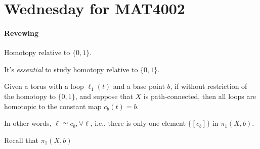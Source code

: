 \section{Wednesday for MAT4002}
\paragraph{Revewing}
Homotopy relative to $\{0,1\}$.

It's \emph{essential} to study homotopy relative to $\{0,1\}$.

Given a torus with a loop $\ell_1(t)$ and a base point $b$,
if without restriction of the homotopy to $\{0,1\}$, and suppose that $X$ is path-connected,
then all loops are homotopic to the constant map $c_b(t)=b$.

In other words, $\ell\simeq c_b,\forall\ell$, i.e., there is only one element $\{[c_b]\}$ in $\pi_1(X,b)$.

Recall that $\pi_1(X,b)$

